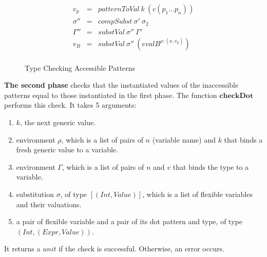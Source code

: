 \begin{figure}[H]
\begin{equation*}
\begin{aligned}
      v_p                                                                                                & = & patternToVal \: k \: (c (p_1 \dots p_n))                                             \\
      \sigma''                                                                                           & = & compSubst \: \sigma' \: \sigma_2                                                     \\
      \Gamma''                                                                                           & = & substVal \: \sigma'' \: \Gamma'                                                      \\
      v_B                                                                                                & = & substVal \: \sigma'' \: (eval B^{\rho : (x,v_p)})                                    \\
    \end{aligned}
  \end{equation*}
  \caption{Type Checking Accessible Patterns}
\end{figure}

\textbf{The second phase} checks that the instantiated values of the inaccessible patterns equal to those instantiated in the first phase. The function $\boldsymbol{checkDot}$ performs this check. It takes 5 arguments:

\begin{enumerate}
  \item $k$, the next generic value.
  \item environment $\rho$, which is a list of pairs of $n$ (variable name) and $k$ that binds a fresh generic value to a variable.
  \item environment $\Gamma$, which is a list of pairs of $n$ and $v$ that binds the type to a variable.
  \item substitution $\sigma$, of type $[(Int, Value)]$, which is a list of flexible variables and their valuations.
  \item a pair of flexible variable and a pair of its dot pattern and type, of type $(Int, (Expr, Value))$.
\end{enumerate}

It returns a $unit$ if the check is successful. Otherwise, an error occurs.

